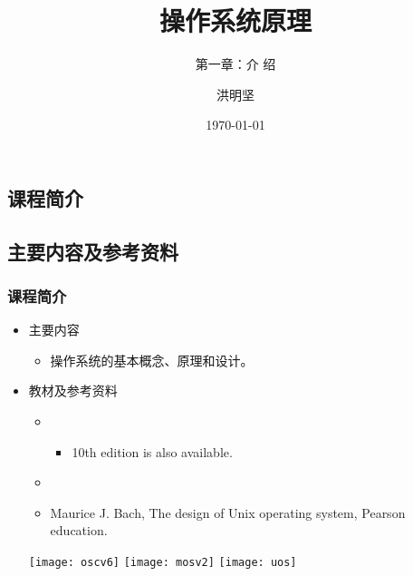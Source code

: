 \documentclass[CJKutf8,xcolor=pdftex,dvipsnames,table]{beamer}
\begin{document}
\begin{CJK*}{UTF8}{song}  

  \title{ 操作系统原理}
  \subtitle{ 第一章：介 绍}
	\author{ 洪明坚}
  \date{\today}


  \frame{\titlepage}


  \section{课程简介}
  \subsection{主要内容及参考资料}

  \begin{frame}
    \frametitle{课程简介} \pause
	  \begin{itemize}
	    \item{主要内容} \pause
	      \begin{itemize}
	      \item{操作系统的基本概念、原理和设计。} \pause
	      \end{itemize}
	    \item{教材及参考资料} \pause
	      \begin{itemize}
	      \item{} \pause
	        \begin{itemize}
	        \item{10th edition is also available.} \pause
	        \end{itemize}
	      \item{} \pause
	      \item{Maurice J. Bach, The design of Unix operating system, Pearson education.} \pause
	      \end{itemize}
	    \begin{center}
	    	\texttt{[image: oscv6]}  \pause
			\hspace{1mm}
	    	\texttt{[image: mosv2]}  \pause
			\hspace{1mm}
	    	\texttt{[image: uos]}    \pause
	    \end{center}
	  \end{itemize}
  \end{frame}


\end{CJK*}
\end{document}
